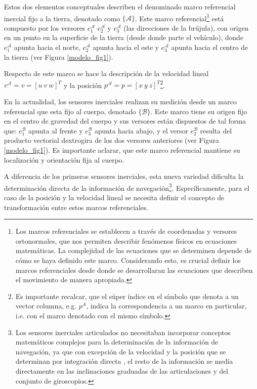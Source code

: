 \documentclass[10pt]{report}
\numberwithin{equation}{chapter}
\numberwithin{algorithm}{chapter}
\newcommand{\marco}[1]{\{\mathcal{#1}\}}
\begin{document}
Estos dos elementos conceptuales describen el denominado marco referencial inercial fijo a la tierra, denotado como $\marco{A}$. Este marco referencial\footnote{Los marcos referenciales se establecen a través de coordenadas y versores ortonormales, que nos permiten describir fenómenos físicos en ecuaciones matemáticas. La complejidad de las ecuaciones que se determinen depende de cómo se haya definido este marco. Considerando esto, es crucial definir los marcos referenciales desde donde se desarrollaran las ecuaciones que describen el movimiento de manera apropiada.} está compuesto por los versores $e^\mathcal{A}_1$ $e^\mathcal{A}_2$ y $e^\mathcal{A}_3$ (las direcciones de la brújula), con origen en un punto en la superficie de la tierra (desde donde parte el vehículo), donde $e^\mathcal{A}_1$ apunta hacia el norte, $e^\mathcal{A}_2$ apunta hacia el este y $e^\mathcal{A}_3$ apunta hacia el centro de la tierra (ver Figura \ref{modelo_fig1}).\par
Respecto de este marco se hace la descripción de la velocidad lineal $v^\mathcal{A}=v=[u~v~w]^T$ y la posición $p^\mathcal{A}=p=[x~y~z]^T$\footnote{Es importante recalcar, que el súper índice en el símbolo que denota a un vector columna, e.g. $p^{A}$, indica la correspondencia a un marco en particular, i.e. con el marco denotado con el mismo símbolo.}.\par
En la actualidad, los sensores inerciales realizan su medición desde un marco referencial que esta fijo al cuerpo, denotado $\marco{B}$. Este marco tiene su origen fijo en el centro de gravedad del cuerpo y sus versores están dispuestos de tal forma que: $e^\mathcal{B}_1$ apunta al frente y $e^\mathcal{B}_3$ apunta hacia abajo, y el versor $e^\mathcal{B}_2$ resulta del producto vectorial dextrogira de los dos versores anteriores (ver Figura \ref{modelo_fig1}). Es importante aclarar, que este marco referencial mantiene su localización y orientación fija al cuerpo.\par
A diferencia de los primeros sensores inerciales, esta nueva variedad dificulta la determinación directa de la información de navegación\footnote{Los sensores inerciales articulados no necesitaban incorporar conceptos matemáticos complejos para la determinación de la información de navegación, ya que con excepción de la velocidad y la posición que se determinan por integración directa , el resto de la información se medía directamente en las inclinaciones graduadas de las articulaciones y del conjunto de giroscopios.}. Específicamente, para el caso de la posición y la velocidad lineal se necesita definir el concepto de transformación entre estos marcos referenciales. 
\end{document}
